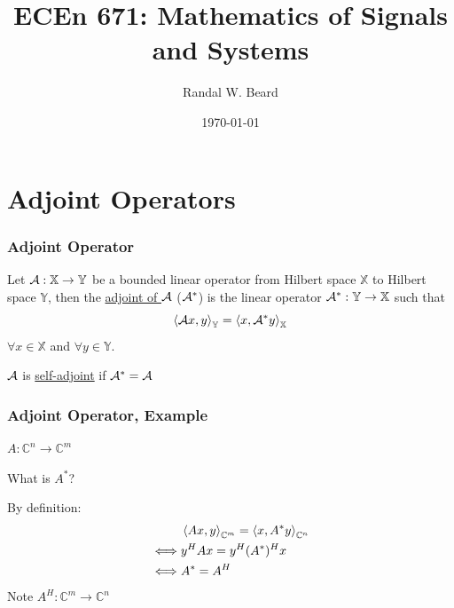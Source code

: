 \documentclass{beamer}
\title{ECEn 671: Mathematics of Signals and Systems}
\author{Randal W. Beard}
\institute{Brigham Young University}
\date{\today}
\begin{document}
\begin{frame}
	\titlepage
\end{frame}




\section{Adjoint Operators}
\frame{\sectionpage}

\begin{frame}\frametitle{Adjoint Operator}
	\begin{definition}
		Let $\mathcal{A}: \mathbb{X} \to \mathbb{Y}$ be a bounded linear operator from Hilbert space $\mathbb{X}$ to Hilbert space $\mathbb{Y}$, then the \underline{adjoint of $\mathcal{A}$} ($\mathcal{A}^\ast$) is the linear operator $\mathcal{A}^\ast:\mathbb{Y}\to\mathbb{X}$ such that
			\[ 
			\left<\mathcal{A} x,y \right>_{\mathbb{Y}} = \left<x,\mathcal{A}^\ast y \right>_{\mathbb{X}} 
			\]
			$\forall x\in\mathbb{X}$ and $\forall y \in \mathbb{Y}$.  
			
			\vspace{1cm}
			
			$\mathcal{A}$ is \underline{self-adjoint} if $\mathcal{A}^\ast=\mathcal{A}$
	\end{definition}
\end{frame}

\begin{frame}\frametitle{Adjoint Operator, Example}
	\begin{example}
		$A:\mathbb{C}^n \to \mathbb{C}^m$	
			
		\vspace{0.5cm}
		What is $A^\ast$?
		\vspace{0.5cm}
		
		By definition:
		\begin{align*}
			& 	\left<Ax,y \right>_{\mathbb{C}^m} = \left<x,A^\ast y \right>_{\mathbb{C}^n} \\
			\iff & y^HAx = y^H (A^\ast)^H x \\
			\iff & A^\ast = A^H
		\end{align*}
		\vspace{0.5cm}
		Note $A^H : \mathbb{C}^m \to \mathbb{C}^n$
	\end{example}
\end{frame}
\end{document}

